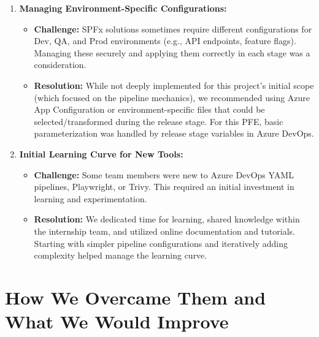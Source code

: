 \begin{enumerate}
    \item \textbf{Managing Environment-Specific Configurations:}
    \begin{itemize}
        \item \textbf{Challenge:} SPFx solutions sometimes require different configurations for Dev, QA, and Prod environments (e.g., API endpoints, feature flags). Managing these securely and applying them correctly in each stage was a consideration.
        \item \textbf{Resolution:} While not deeply implemented for this project's initial scope (which focused on the pipeline mechanics), we recommended using Azure App Configuration or environment-specific files that could be selected/transformed during the release stage. For this PFE, basic parameterization was handled by release stage variables in Azure DevOps.
    \end{itemize}

    \item \textbf{Initial Learning Curve for New Tools:}
    \begin{itemize}
        \item \textbf{Challenge:} Some team members were new to Azure DevOps YAML pipelines, Playwright, or Trivy. This required an initial investment in learning and experimentation.
        \item \textbf{Resolution:} We dedicated time for learning, shared knowledge within the internship team, and utilized online documentation and tutorials. Starting with simpler pipeline configurations and iteratively adding complexity helped manage the learning curve.
    \end{itemize}
\end{enumerate}

\section{How We Overcame Them and What We Would Improve}
\label{sec:OvercomingChallengesImprovements}

